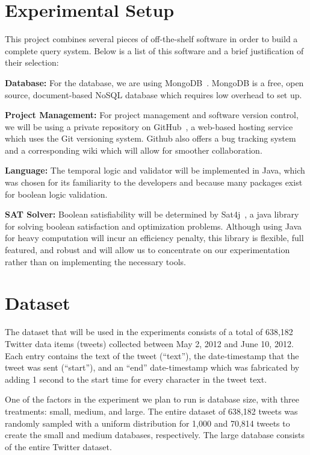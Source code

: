 \documentclass[10pt,letterpaper]{article}
\begin{document}
\section{Experimental Setup}
This project combines several pieces of off-the-shelf software in order to build a complete query system.  Below is a list of this software and a brief justification of their selection:

\textbf{Database:} For the database, we are using MongoDB~\cite{10gen:2013}. MongoDB is a free, open source, document-based NoSQL database which requires low overhead to set up. 

\textbf{Project Management:} For project management and software version control, we will be using a private repository on GitHub~\cite{GitHub:2013}, a web-based hosting service which uses the Git versioning system. Github also offers a bug tracking system and a corresponding wiki which will allow for smoother collaboration. 

\textbf{Language:} The temporal logic and validator will be implemented in Java, which was chosen for its familiarity to the developers and because many packages exist for boolean logic validation. 

\textbf{SAT Solver:}  Boolean satisfiability will be determined by Sat4j~\cite{Een:2003}, a java library for solving boolean satisfaction and optimization problems.  Although using Java for heavy computation will incur an efficiency penalty, this library is flexible, full featured, and robust and will allow us to concentrate on our experimentation rather than on implementing the necessary tools.  

\section{Dataset}
The dataset that will be used in the experiments consists of a total of 638,182 Twitter data items (tweets) collected between May 2, 2012 and June 10, 2012. Each entry contains the text of the tweet (``text''), the date-timestamp that the tweet was sent (``start''), and an ``end'' date-timestamp which was fabricated by adding 1 second to the start time for every character in the tweet text.

One of the factors in the experiment we plan to run is database size, with three treatments: small, medium, and large. The entire dataset of 638,182 tweets was randomly sampled with a uniform distribution for 1,000 and 70,814 tweets to create the small and medium databases, respectively. The large database consists of the entire Twitter dataset. 
\end{document}
